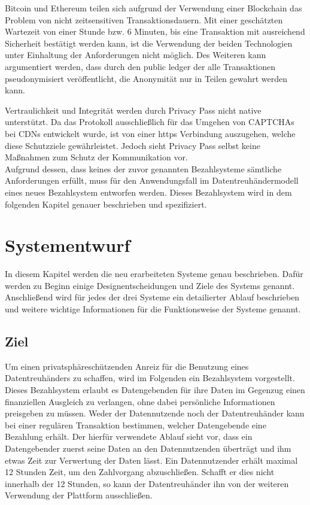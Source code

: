 \documentclass{scrreprt}
\begin{document}
Bitcoin und Ethereum teilen sich aufgrund der Verwendung einer Blockchain das Problem von nicht zeitsensitiven Transaktionsdauern. Mit einer geschätzten Wartezeit von einer Stunde bzw. 6 Minuten, bis eine Transaktion mit ausreichend Sicherheit bestätigt werden kann, ist die Verwendung der beiden Technologien unter Einhaltung der Anforderungen nicht möglich. Des Weiteren kann argumentiert werden, dass durch den public ledger der alle Transaktionen pseudonymisiert veröffentlicht, die Anonymität nur in Teilen gewahrt werden kann. 

Vertraulichkeit und Integrität werden durch Privacy Pass nicht native unterstützt. Da das Protokoll ausschließlich für das Umgehen von CAPTCHAs bei CDNs entwickelt wurde, ist von einer https Verbindung auszugehen, welche diese Schutzziele gewährleistet. Jedoch sieht Privacy Pass selbst keine Maßnahmen zum Schutz der Kommunikation vor.\\

Aufgrund dessen, dass keines der zuvor genannten Bezahlsysteme sämtliche Anforderungen erfüllt, muss für den Anwendungsfall im Datentreuhändermodell eines neues Bezahlsystem entworfen werden. Dieses Bezahlsystem wird in dem folgenden Kapitel genauer beschrieben und spezifiziert. 





\chapter{Systementwurf}
\label{chap:systems}

In diesem Kapitel werden die neu erarbeiteten Systeme genau beschrieben. Dafür werden zu Beginn einige Designentscheidungen und Ziele des Systems genannt. Anschließend wird für jedes der drei Systeme ein detailierter Ablauf beschrieben und weitere wichtige Informationen für die Funktionsweise der Systeme genannt.

\section{Ziel}
\label{sec:mainPart_ziel}
Um einen privatsphäreschützenden Anreiz für die Benutzung eines Datentreuhänders zu schaffen, wird im Folgenden ein Bezahlsystem vorgestellt. Dieses Bezahlsystem erlaubt es Datengebenden für ihre Daten im Gegenzug einen finanziellen Ausgleich zu verlangen, ohne dabei persönliche Informationen preisgeben zu müssen. Weder der Datennutzende noch der Datentreuhänder kann bei einer regulären Transaktion bestimmen, welcher Datengebende eine Bezahlung erhält. Der hierfür verwendete Ablauf sieht vor, dass ein Datengebender zuerst seine Daten an den Datennutzenden überträgt und ihm etwas Zeit zur Verwertung der Daten lässt. Ein Datennutzender erhält maximal 12 Stunden Zeit, um den Zahlvorgang abzuschließen. Schafft er dies nicht innerhalb der 12 Stunden, so kann der Datentreuhänder ihn von der weiteren Verwendung der Plattform ausschließen. 
\end{document}
